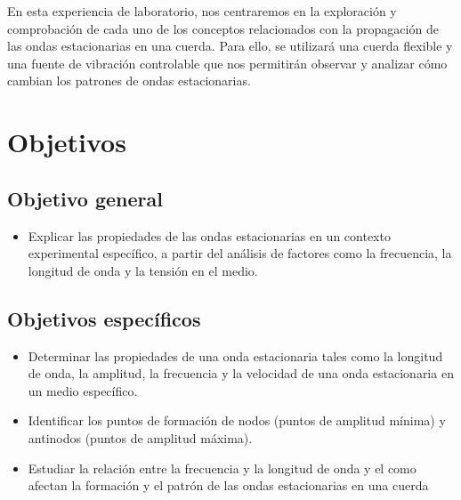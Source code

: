 \documentclass[twocolumn, 12pt]{article}
\begin{document}
En esta experiencia de laboratorio, nos centraremos en la exploración y comprobación de 
cada uno de los conceptos relacionados con la propagación de las ondas estacionarias en 
una cuerda. Para ello, se utilizará una cuerda flexible y una fuente de 
vibración controlable que nos permitirán observar y analizar cómo cambian 
los patrones de ondas estacionarias.


\section{Objetivos}

\subsection{Objetivo general}

\begin{itemize}[label=$\triangleright$]
    \item Explicar las propiedades de las ondas estacionarias en un contexto 
        experimental específico, a partir del análisis de factores como la 
        frecuencia, la longitud de onda y la tensión en el medio.    
\end{itemize}

\subsection{Objetivos específicos}

\begin{itemize}[label=$\triangleright$]
    \item Determinar las propiedades de una onda estacionaria tales como la 
        longitud de onda, la amplitud, la frecuencia y la velocidad de una onda 
        estacionaria en un medio específico.

    \item Identificar los puntos de formación de nodos (puntos de amplitud mínima) 
        y antinodos (puntos de amplitud máxima).

    \item Estudiar la relación entre la frecuencia y la longitud de onda y el como 
        afectan la formación y el patrón de las ondas estacionarias en una cuerda
\end{itemize}

\end{document}
